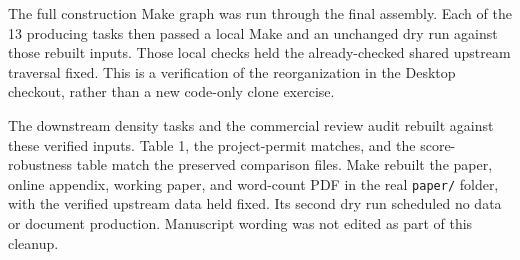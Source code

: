 The full construction Make graph was run through the final assembly. Each of
the 13 producing tasks then passed a local Make and an unchanged dry run
against those rebuilt inputs. Those local checks held the already-checked
shared upstream traversal fixed. This is a verification of the reorganization
in the Desktop checkout, rather than a new code-only clone exercise.

The downstream density tasks and the commercial review audit rebuilt against
these verified inputs. Table 1, the project-permit matches, and the
score-robustness table match the preserved comparison files. Make rebuilt
the paper, online appendix, working paper, and word-count PDF in the real
\texttt{paper/} folder, with the verified upstream data held fixed. Its second
dry run scheduled no data or document production. Manuscript wording was not
edited as part of this cleanup.
